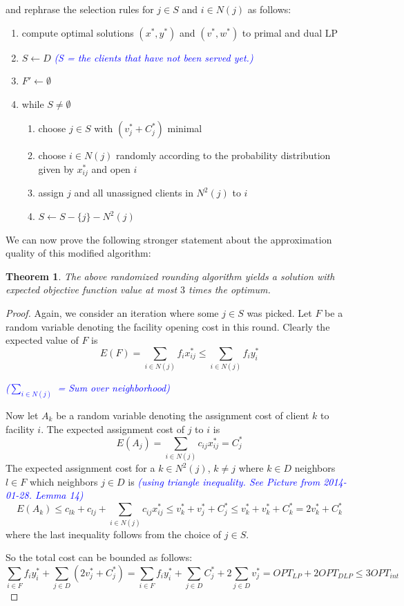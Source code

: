 \documentclass{article}
\newtheorem{theorem}{Theorem}
\begin{document}
and rephrase the selection rules for $j\in S$ and $i\in N(j)$ as follows:
\begin{enumerate}
\item compute optimal solutions $(x^*, y^*)$ and $(v^*,w^*)$ to primal and dual LP
\item $S\leftarrow D$ \textcolor{blue}{\emph{(S = the clients that have not been served yet.)}}
\item $F'\leftarrow\emptyset$
\item while $S\neq \emptyset$
	\begin{enumerate}
	\item choose $j\in S$ with $(v_j^*+C_j^*)$ minimal
	\item choose $i\in N(j)$ randomly according to the probability distribution given by $x^*_{ij}$ and open $i$
	\item assign $j$ and all unassigned clients in $N^2(j)$ to $i$
	\item $S\leftarrow S-\{j\}-N^2(j)$
	\end{enumerate}
\end{enumerate}

We can now prove the following stronger statement about the approximation quality of this modified algorithm:

\begin{theorem}
The above randomized rounding algorithm yields a solution with expected objective function value at most $3$ times the optimum.
\end{theorem}
\begin{proof}
Again, we consider an iteration where some $j\in S$ was picked. Let $F$ be a random variable denoting the facility opening cost in this round. Clearly the expected value of $F$ is
\[
E(F)=\sum_{i\in N(j)}f_i x^*_{ij}\leq \sum_{i\in N(j)} f_i y^*_i
\]

\textcolor{blue}{\emph{($\sum_{i\in N(j)}$ = Sum over neighborhood)}}

Now let $A_k$ be a random variable denoting the assignment cost of client $k$ to facility $i$. The expected assignment cost of $j$ to $i$ is
\[
	E(A_j)=\sum_{i\in N(j)} c_{ij} x^*_{ij}=C_j^*
\] 
The expected assignment cost for a $k\in N^2(j)$, $k\neq j$ where $k\in D$ neighbors $l\in F$ which neighbors $j\in D$ is \textcolor{blue}{\emph{(using triangle inequality. See Picture from 2014-01-28. Lemma 14)}}
\[
	E(A_k)\leq c_{lk} + c_{lj} + \sum_{i\in N(j)}c_{ij}x^*_{ij}\leq v^*_k + v^*_j+ C^*_j \leq v^*_k + v^*_k + C^*_k=2v^*_k +C^*_k
\]
where the last inequality follows from the choice of $j\in S$.

So the total cost can be bounded as follows:
\[
	\sum_{i\in F} f_i y^*_i + \sum_{j\in D} (2v_j^* + C^*_j) = \sum_{i\in F}f_i y^*_i + \sum_{j\in D}C^*_j +  2\sum_{j\in D} v^*_j=OPT_{LP}+2 OPT_{DLP}\leq 3 OPT_{int}
\]

\end{proof}
\end{document}
